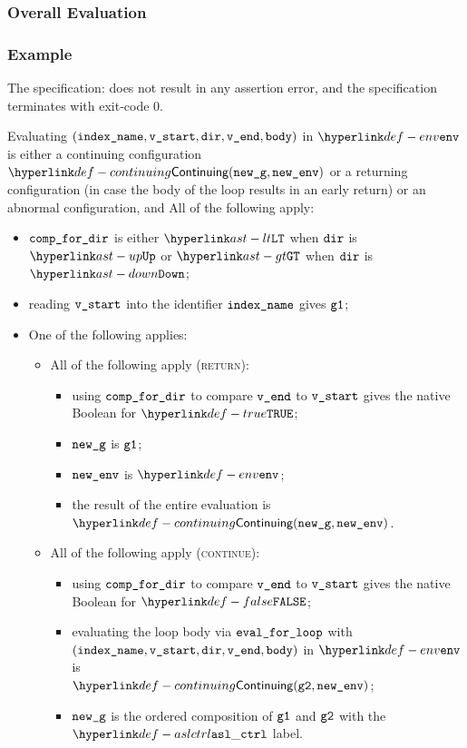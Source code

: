 \subsubsection{Overall Evaluation}
\subsubsection{Example}
The specification:
does not result in any assertion error, and the specification terminates with exit-code $0$.

Evaluating $(\texttt{index\_name}, \texttt{v\_start}, \texttt{dir}, \texttt{v\_end}, \texttt{body})$ in $\env$ is either
a continuing configuration $\Continuing(\newg, \newenv)$ or a returning configuration
(in case the body of the loop results in an early return)
or an abnormal configuration,
and All of the following apply:
\begin{itemize}
  \item $\texttt{comp\_for\_dir}$ is either $\LT$ when $\texttt{dir}$ is $\UP$ or $\GT$ when $\texttt{dir}$ is $\DOWN$;
  \item reading $\texttt{v\_start}$ into the identifier $\texttt{index\_name}$ gives $\texttt{g1}$;
  \item One of the following applies:
    \begin{itemize}
    \item All of the following apply (\textsc{return}):
    \begin{itemize}
      \item using $\texttt{comp\_for\_dir}$ to compare $\texttt{v\_end}$ to $\texttt{v\_start}$ gives the native Boolean for $\True$;
      \item $\texttt{new\_g}$ is $\texttt{g1}$;
      \item $\texttt{new\_env}$ is $\env$;
      \item the result of the entire evaluation is $\Continuing(\newg, \newenv)$.
    \end{itemize}
    \item All of the following apply (\textsc{continue}):
    \begin{itemize}
      \item using $\texttt{comp\_for\_dir}$ to compare $\texttt{v\_end}$ to $\texttt{v\_start}$ gives the native Boolean for $\False$;
      \item evaluating the loop body via $\texttt{eval\_for\_loop}$ with \\ $(\texttt{index\_name}, \texttt{v\_start}, \texttt{dir}, \texttt{v\_end}, \texttt{body})$
      in $\env$ is \\ $\Continuing(\vgtwo, \newenv)$\ProseTerminateAs{\ReturningConfig, \ThrowingConfig, \DynErrorConfig};
      \item $\texttt{new\_g}$ is the ordered composition of $\texttt{g1}$ and $\texttt{g2}$ with the $\aslctrl$ label.
    \end{itemize}
  \end{itemize}
\end{itemize}


